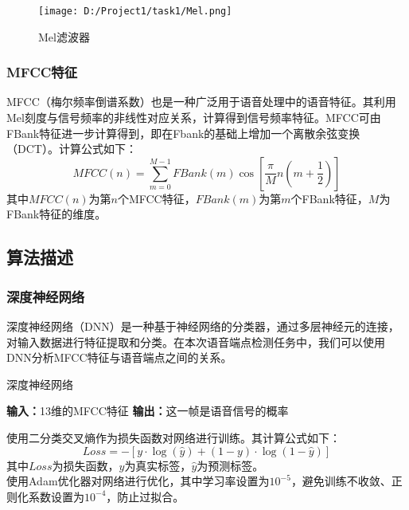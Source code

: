\documentclass[a4paper]{article}
\begin{document}
\begin{figure}[H]
  \centering
\texttt{[image: D:/Project1/task1/Mel.png]}
\caption{Mel滤波器}
\end{figure}

\subsubsection{MFCC特征}

MFCC（梅尔频率倒谱系数）也是一种广泛用于语音处理中的语音特征。其利用Mel刻度与信号频率的非线性对应关系，计算得到信号频率特征。MFCC可由FBank特征进一步计算得到，即在Fbank的基础上增加一个离散余弦变换（DCT）。计算公式如下：
\[MFCC(n) = \sum_{m=0}^{M-1}FBank(m)\cos\left[\frac{\pi}{M}n\left(m+\frac{1}{2}\right)\right]\]
其中$MFCC(n)$为第$n$个MFCC特征，$FBank(m)$为第$m$个FBank特征，$M$为FBank特征的维度。

\subsection{算法描述}


\subsubsection{深度神经网络}

深度神经网络（DNN）是一种基于神经网络的分类器，通过多层神经元的连接，对输入数据进行特征提取和分类。在本次语音端点检测任务中，我们可以使用DNN分析MFCC特征与语音端点之间的关系。

\begin{algorithm}[H]
    \caption{深度神经网络}
    \begin{algorithmic}[1]
        \State\textbf{输入：}13维的MFCC特征
        \State\textbf{输出：}这一帧是语音信号的概率
    \end{algorithmic}
\end{algorithm}

使用二分类交叉熵作为损失函数对网络进行训练。其计算公式如下：
\[Loss = -[y\cdot \log(\hat{y})+(1-y)\cdot \log(1-\hat{y})]\]
其中$Loss$为损失函数，$y$为真实标签，$\hat{y}$为预测标签。\\

使用Adam优化器对网络进行优化，其中学习率设置为$10^{-5}$，避免训练不收敛、正则化系数设置为$10^{-4}$，防止过拟合。
\end{document}
